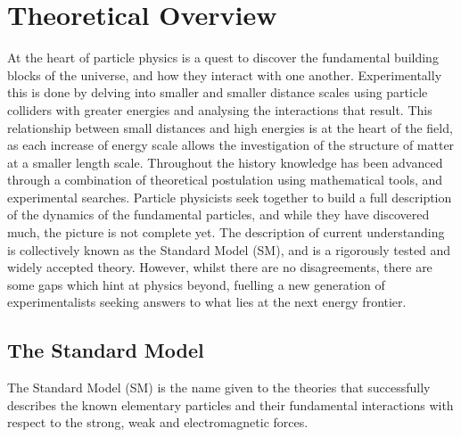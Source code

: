 \chapter{Theoretical Overview}

At the heart of particle physics is a quest to discover the fundamental building blocks of the universe, and how they interact with one another. Experimentally this is done by delving into smaller and smaller distance scales using particle colliders with greater energies and analysing the interactions that result. This relationship between small distances and high energies is at the heart of the field, as each increase of energy scale allows the investigation of the structure of matter at a smaller length scale. Throughout the history knowledge has been advanced through a combination of theoretical postulation using mathematical tools, and experimental searches. Particle physicists seek together to build a full description of the dynamics of the fundamental particles, and while they have discovered much, the picture is not complete yet. The description of current understanding is collectively known as the Standard Model (SM), and is a rigorously tested and widely accepted theory. However, whilst there are no disagreements, there are some gaps which hint at physics beyond, fuelling a new generation of experimentalists seeking answers to what lies at the next energy frontier.

\section{The Standard Model}

The Standard Model (SM) is the name given to the theories that successfully describes the known elementary particles and their fundamental interactions with respect to the strong, weak and electromagnetic forces. 


